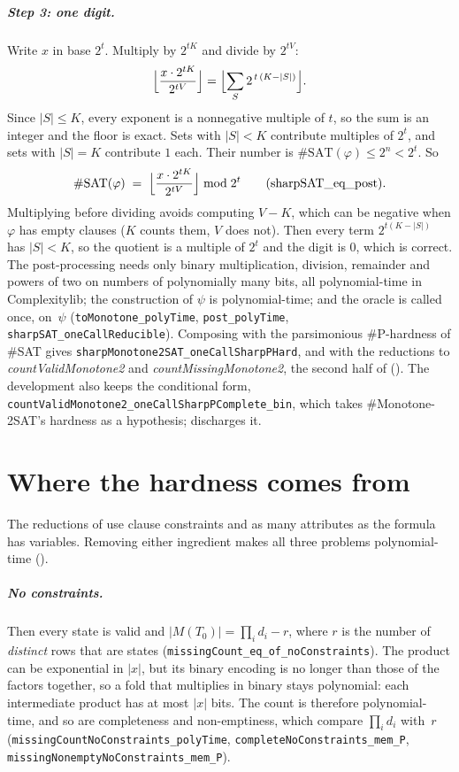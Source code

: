 \documentclass[a4paper,UKenglish,cleveref,autoref,thm-restate]{lipics-v2021}
\begin{document}
\subparagraph*{Step 3: one digit.}
Write $x$ in base $2^t$. Multiply by $2^{tK}$ and divide by $2^{tV}$:
\[
\Bigl\lfloor \frac{x \cdot 2^{tK}}{2^{tV}} \Bigr\rfloor
= \Bigl\lfloor \sum_{S} 2^{\,t\,(K - |S|)} \Bigr\rfloor .
\]
Since $|S| \le K$, every exponent is a nonnegative multiple of $t$, so the sum is an integer and
the floor is exact. Sets with $|S| < K$ contribute multiples of $2^t$, and sets with $|S| = K$
contribute $1$ each. Their number is $\#\mathrm{SAT}(\varphi) \le 2^n < 2^t$. So
\[
\#\mathrm{SAT}(\varphi) \;=\; \Bigl\lfloor \frac{x \cdot 2^{tK}}{2^{tV}} \Bigr\rfloor \bmod 2^t
\qquad (\text{\lstinline{sharpSAT_eq_post}}).
\]
Multiplying before dividing avoids computing $V - K$, which can be negative when $\varphi$ has
empty clauses ($K$ counts them, $V$ does not). Then every term $2^{t(K-|S|)}$ has $|S| < K$, so the
quotient is a multiple of $2^t$ and the digit is $0$, which is correct.
The post-processing needs only binary multiplication, division, remainder and powers of two on
numbers of polynomially many bits, all polynomial-time in Complexitylib; the construction of
$\psi$ is polynomial-time; and the oracle is called once, on~$\psi$
(\lstinline{toMonotone_polyTime}, \lstinline{post_polyTime}, \lstinline{sharpSAT_oneCallReducible}).
Composing with the parsimonious \#P-hardness of \#SAT gives
\lstinline{sharpMonotone2SAT_oneCallSharpPHard}, and with the reductions to
\textit{countValidMonotone2} and \textit{countMissingMonotone2}, the second half of
 (). The development also keeps
the conditional form, \lstinline{countValidMonotone2_oneCallSharpPComplete_bin}, which takes
\#Monotone-2SAT's hardness as a hypothesis;  discharges it.

\section{Where the hardness comes from}
\label{sec:boundary}

The reductions of  use clause constraints and as many
attributes as the formula has variables. Removing either ingredient makes all three problems
polynomial-time ().

\subparagraph*{No constraints.}
Then every state is valid and $|M(T_0)| = \prod_i d_i - r$, where $r$ is the number of
\emph{distinct} rows that are states (\lstinline{missingCount_eq_of_noConstraints}). The product
can be exponential in $|x|$, but its binary encoding is no longer than those of the factors
together, so a fold that multiplies in binary stays polynomial: each intermediate product has
at most $|x|$ bits. The count is therefore polynomial-time, and so are completeness and
non-emptiness, which compare $\prod_i d_i$ with~$r$ (\lstinline{missingCountNoConstraints_polyTime},
\lstinline{completeNoConstraints_mem_P}, \lstinline{missingNonemptyNoConstraints_mem_P}).
\end{document}
